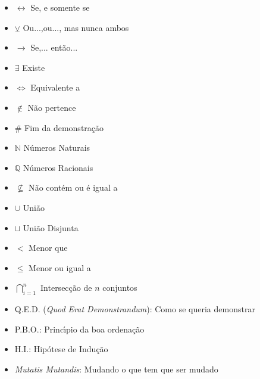 \begin{minipage}[r]{0,5\textwidth}
\begin{itemize}

\item $\leftrightarrow$ Se, e somente se
\item $\veebar$ Ou...,ou..., mas nunca ambos
\item $\rightarrow$ Se,... ent{\~a}o...
\item $\exists$ Existe
\item $\Leftrightarrow$ Equivalente a
\item $\notin$ N{\~a}o pertence
\item \# Fim da demonstra{\c c}{\~a}o
\item $\mathbb{N}$ N{\'u}meros Naturais
\item $\mathbb{Q}$ N{\'u}meros Racionais
\item $\nsubseteq$ N{\~a}o cont{\'e}m ou {\'e} igual a
\item $\cup$ Uni{\~a}o
\item $\sqcup$ Uni{\~a}o Disjunta
\item $<$ Menor que
\item $\leq$ Menor ou igual a
\item $\displaystyle\bigcap_{i=1}^{n}$ Intersec{\c c}{\~a}o de $n$ conjuntos
\item Q.E.D. (\textit{Quod Erat Demonstrandum}): Como se queria demonstrar
\item P.B.O.: Princ{\'\i}pio da boa ordena{\c c}{\~a}o
\item H.I.: Hip{\'o}tese de Indu{\c c}{\~a}o
\item \textit{Mutatis Mutandis}:  Mudando o que tem que ser mudado

\end{itemize}
\end{minipage}